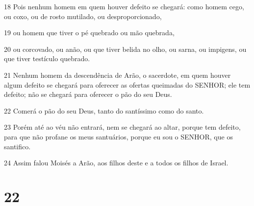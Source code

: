 \par 18 Pois nenhum homem em quem houver defeito se chegará: como homem cego, ou coxo, ou de rosto mutilado, ou desproporcionado,
\par 19 ou homem que tiver o pé quebrado ou mão quebrada,
\par 20 ou corcovado, ou anão, ou que tiver belida no olho, ou sarna, ou impigens, ou que tiver testículo quebrado.
\par 21 Nenhum homem da descendência de Arão, o sacerdote, em quem houver algum defeito se chegará para oferecer as ofertas queimadas do SENHOR; ele tem defeito; não se chegará para oferecer o pão do seu Deus.
\par 22 Comerá o pão do seu Deus, tanto do santíssimo como do santo.
\par 23 Porém até ao véu não entrará, nem se chegará ao altar, porque tem defeito, para que não profane os meus santuários, porque eu sou o SENHOR, que os santifico.
\par 24 Assim falou Moisés a Arão, aos filhos deste e a todos os filhos de Israel.

\chapter{22}

